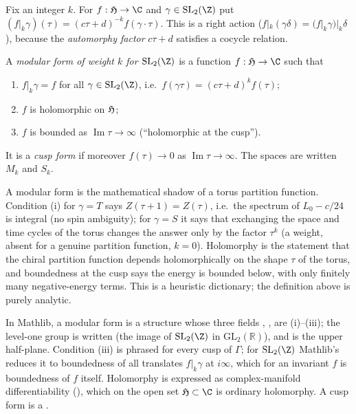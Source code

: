 Fix an integer $k$. For $f:\chfiveH\to\C$ and $\gamma\in\chfiveSL$ put
$(f|_k\gamma)(\tau) = (c\tau+d)^{-k} f(\gamma\cdot\tau)$. This is a right action
($f|_k(\gamma\delta) = (f|_k\gamma)|_k\delta$), because the \emph{automorphy factor} $c\tau+d$ satisfies
a cocycle relation.

\begin{definition}\label{ch05:def:modform}
A \emph{modular form of weight $k$ for $\chfiveSL$} is a function $f:\chfiveH\to\C$ such that
\begin{enumerate}[label=(\roman*)]
  \item $f|_k\gamma = f$ for all $\gamma\in\chfiveSL$, i.e.\ $f(\gamma\tau) = (c\tau+d)^k f(\tau)$;
  \item $f$ is holomorphic on $\mathfrak{H}$;
  \item $f$ is bounded as $\operatorname{Im}\tau\to\infty$ (``holomorphic at the cusp'').
\end{enumerate}
It is a \emph{cusp form} if moreover $f(\tau)\to 0$ as $\operatorname{Im}\tau\to\infty$. The spaces are
written $M_k$ and $S_k$.
\end{definition}

\begin{physics}
A modular form is the mathematical shadow of a torus partition function. Condition (i) for $\gamma=T$ says $Z(\tau+1)=Z(\tau)$, i.e.\ the spectrum of $L_0-c/24$ is integral (no spin ambiguity); for $\gamma=S$ it says that exchanging the space and time cycles of the torus changes the answer only by the factor $\tau^k$ (a weight, absent for a genuine partition function, $k=0$). Holomorphy is the statement that the chiral partition function depends holomorphically on the shape $\tau$ of the torus, and boundedness at the cusp says the energy is bounded below, with only finitely many negative-energy terms. This is a heuristic dictionary; the definition above is purely analytic.
\end{physics}

In Mathlib, a modular form is a structure  whose three fields
, ,  are (i)--(iii); the level-one group is
written  (the image of $\chfiveSL$ in $\mathrm{GL}_2(\mathbb R)$), and  is the upper
half-plane. Condition (iii) is phrased for every cusp of $\Gamma$; for $\chfiveSL$ Mathlib's
 reduces it to boundedness of all translates
$f|_k\gamma$ at $i\infty$, which for an invariant $f$ is boundedness of $f$ itself. Holomorphy is
expressed as complex-manifold differentiability (), which on the open set
$\chfiveH\subset\C$ is ordinary holomorphy. A cusp form is a .

